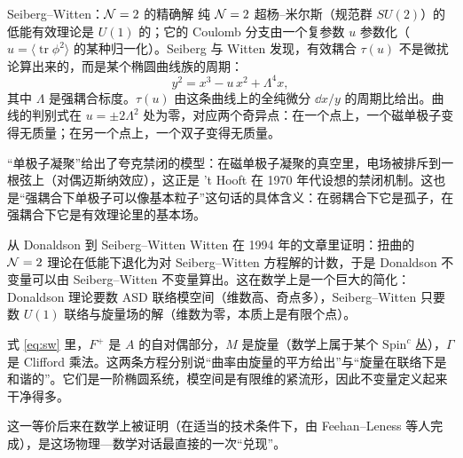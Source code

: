 \begin{pizhu}{Seiberg--Witten：$\mathcal{N}=2$ 的精确解}
纯 $\mathcal{N}=2$ 超杨--米尔斯（规范群 $SU(2)$）的低能有效理论是 $U(1)$ 的；它的 Coulomb 分支由一个复参数 $u$ 参数化（$u=\langle\operatorname{tr}\phi^2\rangle$ 的某种归一化）。Seiberg 与 Witten 发现，有效耦合 $\tau(u)$ 不是微扰论算出来的，而是某个椭圆曲线族的周期：
\[
  y^2=x^3-u\,x^2+\Lambda^4 x ,
\]
其中 $\Lambda$ 是强耦合标度。$\tau(u)$ 由这条曲线上的全纯微分 $\dd x/y$ 的周期比给出。曲线的判别式在 $u=\pm2\Lambda^2$ 处为零，对应两个奇异点：在一个点上，一个磁单极子变得无质量；在另一个点上，一个双子变得无质量。

“单极子凝聚”给出了夸克禁闭的模型：在磁单极子凝聚的真空里，电场被排斥到一根弦上（对偶迈斯纳效应），这正是 't Hooft 在 1970 年代设想的禁闭机制。这也是“强耦合下单极子可以像基本粒子”这句话的具体含义：在弱耦合下它是孤子，在强耦合下它是有效理论里的基本场。
\end{pizhu}

\begin{pizhu}{从 Donaldson 到 Seiberg--Witten}
Witten 在 1994 年的文章里证明：扭曲的 $\mathcal{N}=2$ 理论在低能下退化为对 Seiberg--Witten 方程解的计数，于是 Donaldson 不变量可以由 Seiberg--Witten 不变量算出。这在数学上是一个巨大的简化：Donaldson 理论要数 ASD 联络模空间（维数高、奇点多），Seiberg--Witten 只要数 $U(1)$ 联络与旋量场的解（维数为零，本质上是有限个点）。

式 \eqref{eq:sw} 里，$F^+$ 是 $A$ 的自对偶部分，$M$ 是旋量（数学上属于某个 $\mathrm{Spin}^c$ 丛），$\Gamma$ 是 Clifford 乘法。这两条方程分别说“曲率由旋量的平方给出”与“旋量在联络下是和谐的”。它们是一阶椭圆系统，模空间是有限维的紧流形，因此不变量定义起来干净得多。

这一等价后来在数学上被证明（在适当的技术条件下，由 Feehan--Leness 等人完成），是这场物理—数学对话最直接的一次“兑现”。
\end{pizhu}
